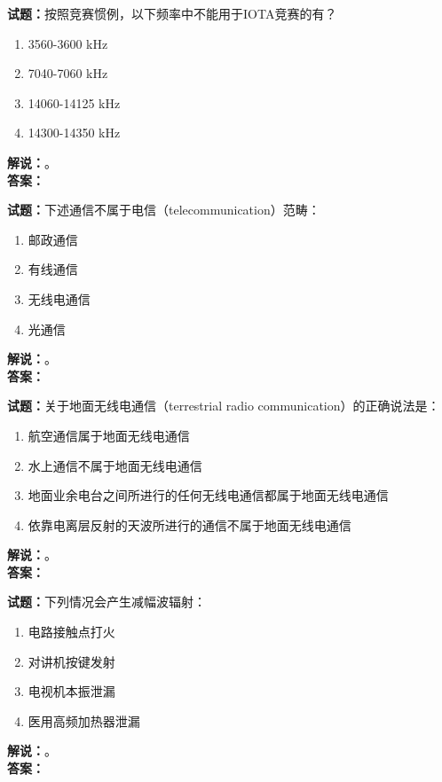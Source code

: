 \documentclass{ctexbook}
\begin{document}
\bigskip




\noindent\textbf{试题：}按照竞赛惯例，以下频率中不能用于IOTA竞赛的有？
\begin{enumerate}[leftmargin=3em]
\item 3560-3600 \unit{\kHz}
\item 7040-7060 \unit{\kHz}
\item 14060-14125 \unit{\kHz}
\item 14300-14350 \unit{\kHz}
\end{enumerate}
\noindent\textbf{解说：}\textbf{}。\\\noindent\textbf{答案：}

\bigskip




\noindent\textbf{试题：}下述通信不属于电信（telecommunication）范畴：
\begin{enumerate}[leftmargin=3em]
\item 邮政通信
\item 有线通信
\item 无线电通信
\item 光通信
\end{enumerate}
\noindent\textbf{解说：}\textbf{}。\\\noindent\textbf{答案：}

\bigskip




\noindent\textbf{试题：}关于地面无线电通信（terrestrial radio communication）的正确说法是：
\begin{enumerate}[leftmargin=3em]
\item 航空通信属于地面无线电通信
\item 水上通信不属于地面无线电通信
\item 地面业余电台之间所进行的任何无线电通信都属于地面无线电通信
\item 依靠电离层反射的天波所进行的通信不属于地面无线电通信
\end{enumerate}
\noindent\textbf{解说：}\textbf{}。\\\noindent\textbf{答案：}

\bigskip




\noindent\textbf{试题：}下列情况会产生减幅波辐射：
\begin{enumerate}[leftmargin=3em]
\item 电路接触点打火
\item 对讲机按键发射
\item 电视机本振泄漏
\item 医用高频加热器泄漏
\end{enumerate}
\noindent\textbf{解说：}\textbf{}。\\\noindent\textbf{答案：}
\end{document}

